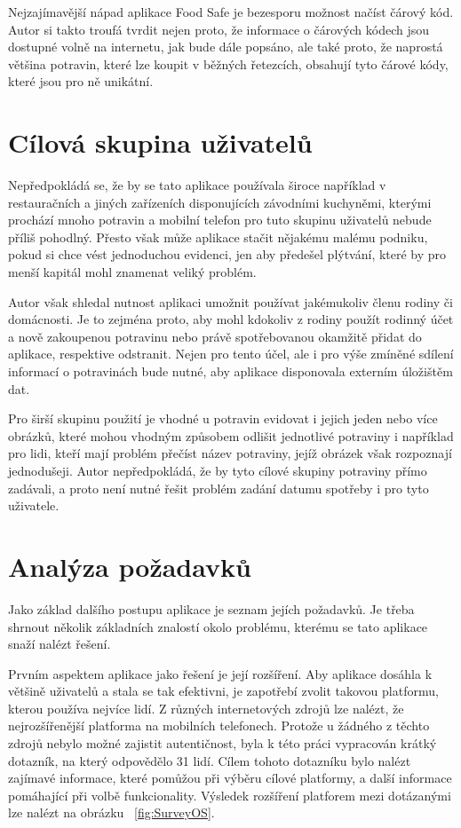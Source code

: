 \documentclass[thesis=B,czech]{FITthesis}[2013/10/20]
\begin{document}
Nejzajímavější nápad aplikace Food Safe je bezesporu možnost načíst čárový kód. Autor si takto troufá tvrdit nejen proto, že informace o čárových kódech jsou dostupné volně na internetu, jak bude dále popsáno, ale také proto, že naprostá většina potravin, které lze koupit v běžných řetezcích, obsahují tyto čárové kódy, které jsou pro ně unikátní.

\section{Cílová skupina uživatelů}

Nepředpokládá se, že by se tato aplikace používala široce například v restauračních a jiných zařízeních disponujících závodními kuchyněmi, kterými prochází mnoho potravin a mobilní telefon pro tuto skupinu uživatelů nebude příliš pohodlný. Přesto však může aplikace stačit nějakému malému podniku, pokud si chce vést jednoduchou evidenci, jen aby předešel plýtvání, které by pro menší kapitál mohl znamenat veliký problém.

Autor však shledal nutnost aplikaci umožnit používat jakémukoliv členu rodiny či domácnosti. Je to zejména proto, aby mohl kdokoliv z rodiny použít rodinný účet a nově zakoupenou potravinu nebo právě spotřebovanou okamžitě přidat do aplikace, respektive odstranit. Nejen pro tento účel, ale i pro výše zmíněné sdílení informací o potravinách bude nutné, aby aplikace disponovala externím úložištěm dat.

Pro širší skupinu použití je vhodné u potravin evidovat i jejich jeden nebo více obrázků, které mohou vhodným způsobem odlišit jednotlivé potraviny i například pro lidi, kteří mají problém přečíst název potraviny, jejíž obrázek však rozpoznají jednodušeji. Autor nepředpokládá, že by tyto cílové skupiny potraviny přímo zadávali, a proto není nutné řešit problém zadání datumu spotřeby i pro tyto uživatele.

\clearpage

\section{Analýza požadavků}

Jako základ dalšího postupu aplikace je seznam jejích požadavků. Je třeba shrnout několik základních znalostí okolo problému, kterému se tato aplikace snaží nalézt řešení.

Prvním aspektem aplikace jako řešení je její rozšíření. Aby aplikace dosáhla k většině uživatelů a stala se tak efektivni, je zapotřebí zvolit takovou platformu, kterou používa nejvíce lidí. Z různých internetových zdrojů lze nalézt, že nejrozšířenější platforma na mobilních telefonech. Protože u žádného z těchto zdrojů nebylo možné zajistit autentičnost, byla k této práci vypracován krátký dotazník, na který odpovědělo 31 lidí. Cílem tohoto dotazníku bylo nalézt zajímavé informace, které pomůžou při výběru cílové platformy, a další informace pomáhající při volbě funkcionality. Výsledek rozšíření platforem mezi dotázanými lze nalézt na obrázku ~\ref{fig:SurveyOS}.
\end{document}

